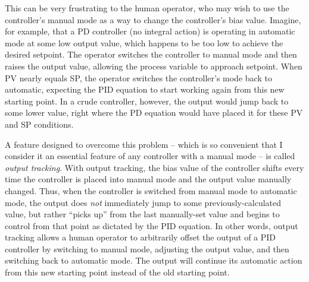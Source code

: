 This can be very frustrating to the human operator, who may wish to use the controller's manual mode as a way to change the controller's bias value.  Imagine, for example, that a PD controller (no integral action) is operating in automatic mode at some low output value, which happens to be too low to achieve the desired setpoint.  The operator switches the controller to manual mode and then raises the output value, allowing the process variable to approach setpoint.  When PV nearly equals SP, the operator switches the controller's mode back to automatic, expecting the PID equation to start working again from this new starting point.  In a crude controller, however, the output would jump back to some lower value, right where the PD equation would have placed it for these PV and SP conditions.

A feature designed to overcome this problem -- which is so convenient that I consider it an essential feature of any controller with a manual mode -- is called \textit{output tracking}.  With output tracking, the bias value of the controller shifts every time the controller is placed into manual mode and the output value manually changed.  Thus, when the controller is switched from manual mode to automatic mode, the output does \textit{not} immediately jump to some previously-calculated value, but rather ``picks up'' from the last manually-set value and begins to control from that point as dictated by the PID equation.  In other words, output tracking allows a human operator to arbitrarily offset the output of a PID controller by switching to manual mode, adjusting the output value, and then switching back to automatic mode.  The output will continue its automatic action from this new starting point instead of the old starting point.  

